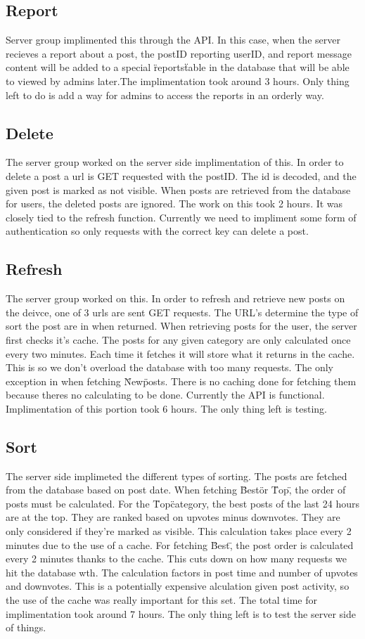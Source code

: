 \documentclass[12pt]{article}
\begin{document}
      \subsection{Report}
      Server group implimented this through the API.  In this case, when the server recieves a report about a post, the postID reporting userID, and report message content will be added to a special \"reports\" table in the database that will be able to viewed by admins later.The implimentation took around 3 hours.  Only thing left to do is add a way for admins to access the reports in an orderly way.
      \subsection{Delete}
      The server group worked on the server side implimentation of this.  In order to delete a post a url is GET requested with the postID.  The id is decoded, and the given post is marked as not visible.  When posts are retrieved from the database for users, the deleted posts are ignored.  The work on this took 2 hours.  It was closely tied to the refresh function.  Currently we need to impliment some form of authentication so only requests with the correct key can delete a post.
      \subsection{Refresh}
      The server group worked on this.  In order to refresh and retrieve new posts on the deivce, one of 3 urls are sent GET requests.  The URL's determine the type of sort the post are in when returned.  When retrieving posts for the user, the server first checks it's cache.  The posts for any given category are only calculated once every two minutes.  Each time it fetches it will store what it returns in the cache.  This is so we don't overload the database with too many requests.  The only exception in when fetching \"New\" posts. There is no caching done for fetching them because theres no calculating to be done.  Currently the API is functional.  Implimentation of this portion took 6 hours.  The only thing left is testing.
      \subsection{Sort}
      The server side implimeted the different types of sorting.  The posts are fetched from the database based on post date.  When fetching \"Best\" or \"Top\", the order of posts must be calculated.  For the \"Top\" category, the best posts of the last 24 hours are at the top.  They are ranked based on upvotes minus downvotes.  They are only considered if they're marked as visible.  This calculation takes place every 2 minutes due to the use of a cache.  For fetching \"Best\", the post order is calculated every 2 minutes thanks to the cache.  This cuts down on how many requests we hit the database wth.  The calculation factors in post time and  number of upvotes and downvotes.  This is a potentially expensive alculation given post activity, so the use of the cache was really important for this set.  The total time for implimentation took around 7 hours.  The only thing left is to test the server side of things.
\end{document}
